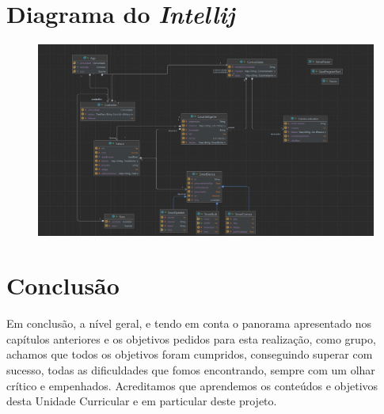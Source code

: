 \documentclass[11pt,a4paper]{report}
\begin{document}
\pagebreak

\chapter{Diagrama do \textit{Intellij}}
\begin{figure}[H]
			\includegraphics[scale=0.30]{diagramaIntellij.jpg}
	\end{figure}
    
    
\pagebreak	
	\chapter{Conclusão}
    
    Em conclusão, a nível geral, e tendo em conta o panorama apresentado nos capítulos anteriores e os objetivos pedidos para esta realização, como grupo, achamos que todos os objetivos foram cumpridos, conseguindo superar com sucesso, todas as dificuldades que fomos encontrando,  sempre com um olhar crítico e empenhados. Acreditamos que aprendemos os conteúdos e objetivos desta Unidade Curricular e em particular deste projeto.
	
\end{document}
